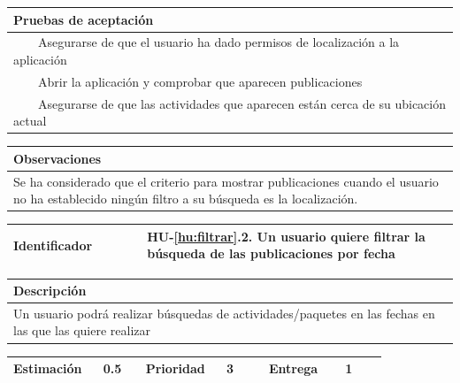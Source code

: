 \documentclass[11pt]{article}
\newcommand{\tabitem}{~~\llap{\textbullet}~~}
\begin{document}
  \begin{longtable}{p{1.028\linewidth}}
    \textbf{Pruebas de aceptación}\\
    \midrule
    \tabitem Asegurarse de que el usuario ha dado permisos de localización a la aplicación\\
    \tabitem Abrir la aplicación y comprobar que aparecen publicaciones\\
    \tabitem Asegurarse de que las actividades que aparecen están cerca de su ubicación actual\\
\end{longtable}
\begin{longtable}{p{1.028\linewidth}}
  \textbf{Observaciones}\\
  \midrule
  Se ha considerado que el criterio para mostrar publicaciones cuando el usuario no ha establecido ningún filtro a su búsqueda es la localización.\\
  \bottomrule
  \bottomrule
\end{longtable}

  \centering
  \begin{longtable}{p{0.3\linewidth}|p{0.7\linewidth}}
    \toprule
    \toprule
    \textbf{Identificador} & \textbf{HU-\ref{hu:filtrar}.2}. Un usuario quiere filtrar la búsqueda de las publicaciones por fecha\\
    
    \bottomrule
  \end{longtable}

  \begin{longtable}{p{1.028\linewidth}}
    \textbf{Descripción}\\
    \midrule
    Un usuario podrá realizar búsquedas de actividades/paquetes en las fechas en las que las quiere realizar
  \end{longtable}
  \begin{longtable}{p{0.18\linewidth}|p{0.1\linewidth}|p{0.18\linewidth}|p{0.1\linewidth}|p{0.18\linewidth}|p{0.1\linewidth}}
    \toprule
    \textbf{Estimación} & 0.5 & \textbf{Prioridad} & 3 & \textbf{Entrega} & 1 \\
    \bottomrule
  \end{longtable}
\end{document}
